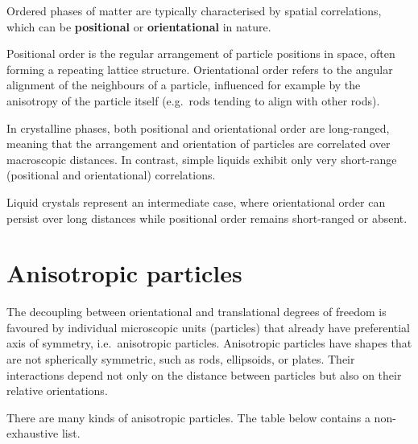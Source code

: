 \documentclass[
  letterpaper,
  enabledeprecatedfontcommands]{report}
\begin{document}
Ordered phases of matter are typically characterised by spatial
correlations, which can be \textbf{positional} or \textbf{orientational}
in nature.

Positional order is the regular arrangement of particle positions in
space, often forming a repeating lattice structure. Orientational order
refers to the angular alignment of the neighbours of a particle,
influenced for example by the anisotropy of the particle itself
(e.g.~rods tending to align with other rods).

In crystalline phases, both positional and orientational order are
long-ranged, meaning that the arrangement and orientation of particles
are correlated over macroscopic distances. In contrast, simple liquids
exhibit only very short-range (positional and orientational)
correlations.

Liquid crystals represent an intermediate case, where orientational
order can persist over long distances while positional order remains
short-ranged or absent.

\section{Anisotropic particles}\label{anisotropic-particles}

The decoupling between orientational and translational degrees of
freedom is favoured by individual microscopic units (particles) that
already have preferential axis of symmetry, i.e.~anisotropic particles.
Anisotropic particles have shapes that are not spherically symmetric,
such as rods, ellipsoids, or plates. Their interactions depend not only
on the distance between particles but also on their relative
orientations.

There are many kinds of anisotropic particles. The table below contains
a non-exhaustive list.
\end{document}
